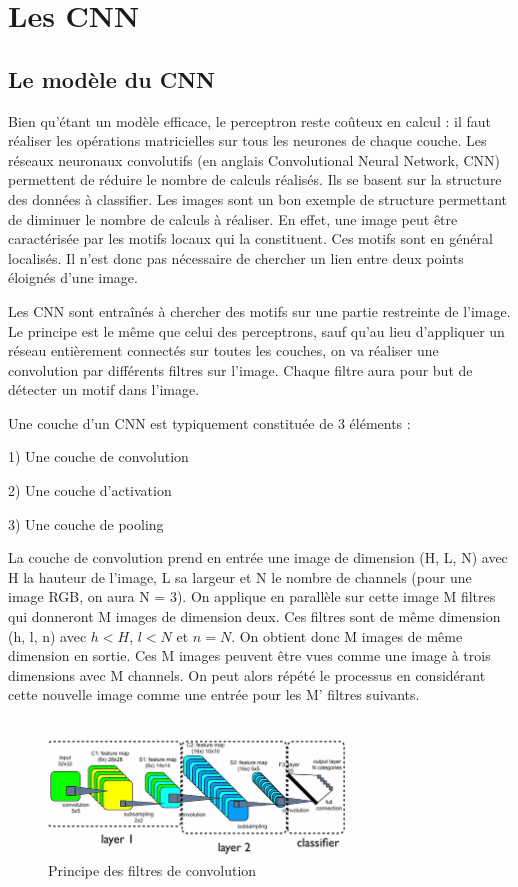 \section{Les CNN}

\fancyhead[R]{\textit{\nouppercase{\leftmark}}}

\subsection{Le modèle du CNN}

Bien qu'étant un modèle efficace, le perceptron reste coûteux en calcul : il faut réaliser les opérations matricielles sur tous les neurones de chaque couche.
Les réseaux neuronaux convolutifs (en anglais Convolutional Neural Network, CNN) permettent de réduire le nombre de calculs réalisés. Ils se basent sur la structure des données à classifier.
Les images sont un bon exemple de structure permettant de diminuer le nombre de calculs à réaliser. En effet, une image peut être caractérisée par les motifs locaux qui la constituent. Ces motifs sont en général localisés. Il n'est donc pas nécessaire de chercher un lien entre deux points éloignés d'une image.

Les CNN sont entraînés à chercher des motifs sur une partie restreinte de l'image.
Le principe est le même que celui des perceptrons, sauf qu'au lieu d'appliquer un réseau entièrement connectés sur toutes les couches, on va réaliser une convolution par différents filtres sur l'image. Chaque filtre aura pour but de détecter un motif dans l'image.

Une couche d'un CNN est typiquement constituée de 3 éléments : 

1) Une couche de convolution

2) Une couche d'activation 

3) Une couche de pooling


La couche de convolution prend en entrée une image de dimension (H, L, N) avec H la hauteur de l'image, L sa largeur et N le nombre de channels (pour une image RGB, on aura N = 3). 
On applique en parallèle sur cette image M filtres qui donneront M images de dimension deux. Ces filtres sont de même dimension (h, l, n) avec $h<H$, $l<N$ et $n=N$. On obtient donc M images de même dimension en sortie. Ces M images peuvent être vues comme une image à trois dimensions avec M channels. On peut alors répété le processus en considérant cette nouvelle image comme une entrée pour les M' filtres suivants.

\begin{figure}[h]
 \centering
 \includegraphics[width=0.7\textwidth]{img/CNN_filtre.png}
 \caption{Principe des filtres de convolution}
\end{figure}

